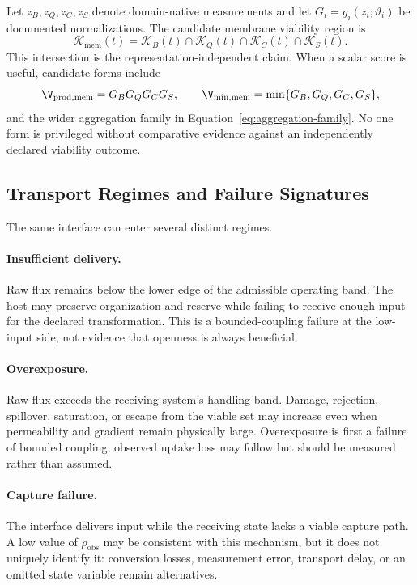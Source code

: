 Let \(z_B,z_Q,z_C,z_S\) denote domain-native measurements and let \(G_i=g_i(z_i;\vartheta_i)\) be documented normalizations. The candidate membrane viability region is
\begin{equation}
    \mathcal K_{\mathrm{mem}}(t)
    =
    \mathcal K_B(t)
    \cap
    \mathcal K_Q(t)
    \cap
    \mathcal K_C(t)
    \cap
    \mathcal K_S(t).
    \label{eq:membrane-viability-region}
\end{equation}
This intersection is the representation-independent claim. When a scalar score is useful, candidate forms include
\begin{equation}
    \V_{\mathrm{prod,mem}}
    =
    G_BG_QG_CG_S,
    \qquad
    \V_{\min,\mathrm{mem}}
    =
    \min\{G_B,G_Q,G_C,G_S\},
    \label{eq:membrane-candidate-scores}
\end{equation}
and the wider aggregation family in Equation~\eqref{eq:aggregation-family}. No one form is privileged without comparative evidence against an independently declared viability outcome.

\subsection{Transport Regimes and Failure Signatures}

The same interface can enter several distinct regimes.

\paragraph{Insufficient delivery.}
Raw flux remains below the lower edge of the admissible operating band. The host may preserve organization and reserve while failing to receive enough input for the declared transformation. This is a bounded-coupling failure at the low-input side, not evidence that openness is always beneficial.

\paragraph{Overexposure.}
Raw flux exceeds the receiving system's handling band. Damage, rejection, spillover, saturation, or escape from the viable set may increase even when permeability and gradient remain physically large. Overexposure is first a failure of bounded coupling; observed uptake loss may follow but should be measured rather than assumed.

\paragraph{Capture failure.}
The interface delivers input while the receiving state lacks a viable capture path. A low value of \(\rho_{\mathrm{obs}}\) may be consistent with this mechanism, but it does not uniquely identify it: conversion losses, measurement error, transport delay, or an omitted state variable remain alternatives.

